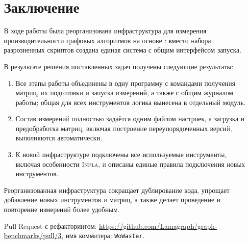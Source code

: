 
\section{Заключение}
\label{sec:conclusion}

В ходе работы была реорганизована инфраструктура для измерения производительности графовых алгоритмов на основе \INs{}: вместо набора разрозненных скриптов создана единая система с общим интерфейсом запуска.

В результате решения поставленных задач получены следующие результаты:

\begin{enumerate}
    \item Все этапы работы объединены в одну программу с командами получения матриц, их подготовки и запуска измерений, а также с общим журналом работы; общая для всех инструментов логика вынесена в отдельный модуль.
    \item Состав измерений полностью задаётся одним файлом настроек, а загрузка и предобработка матриц, включая построение переупорядоченных версий, выполняются автоматически.
    \item К новой инфраструктуре подключены все используемые инструменты, включая особенности \textsc{Inpla}, и описаны единые правила подключения новых инструментов.
\end{enumerate}

Реорганизованная инфраструктура сокращает дублирование кода, упрощает добавление новых инструментов и матриц, а также делает проведение и повторение измерений более удобным.

Pull Request с рефакторингом: \url{https://github.com/Lamagraph/graph-benchmarks/pull/3}, имя коммитера: \texttt{WoWaster}.
